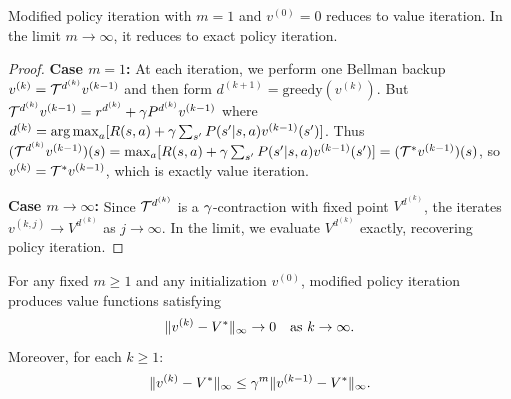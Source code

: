 \documentclass[11pt,a4paper]{article}
\begin{document}
\begin{proposition}
\label{prop:mpi-extremes}
Modified policy iteration with $m = 1$ and $v^{(0)} = 0$ reduces
to value iteration. In the limit $m \to \infty$, it reduces to
exact policy iteration.
\end{proposition}

\begin{proof}
\textbf{Case $m = 1$:} At each iteration, we perform one Bellman
backup $v^{(k)} = \mathcal{T}^{d^{(k)}} v^{(k-1)}$ and then form
$d^{(k+1)} = \text{greedy}(v^{(k)})$. But
$\mathcal{T}^{d^{(k)}} v^{(k-1)} = r^{d^{(k)}} + \gamma P^{d^{(k)}}
v^{(k-1)}$ where $d^{(k)} = \operatorname{arg\,max}_a [R(s,a) + \gamma
\sum_{s'} P(s'|s,a) v^{(k-1)}(s')]$.
Thus $(\mathcal{T}^{d^{(k)}} v^{(k-1)})(s)
= \max_a [R(s,a) + \gamma \sum_{s'} P(s'|s,a) v^{(k-1)}(s')]
= (\mathcal{T}^* v^{(k-1)})(s)$,
so $v^{(k)} = \mathcal{T}^* v^{(k-1)}$, which is exactly value iteration.

\textbf{Case $m \to \infty$:} Since $\mathcal{T}^{d^{(k)}}$ is a
$\gamma$-contraction with fixed point $V^{d^{(k)}}$, the
iterates $v^{(k,j)} \to V^{d^{(k)}}$ as $j \to \infty$. In the
limit, we evaluate $V^{d^{(k)}}$ exactly, recovering policy iteration.
\end{proof}

\begin{theorem}
\label{thm:mpi-convergence}
For any fixed $m \geq 1$ and any initialization $v^{(0)}$, modified
policy iteration produces value functions satisfying
\[
    \|v^{(k)} - V^*\|_\infty \to 0 \quad \text{as } k \to \infty.
\]
Moreover, for each $k \geq 1$:
\begin{equation}
\label{eq:mpi-bound}
    \|v^{(k)} - V^*\|_\infty \leq \gamma^m
    \|v^{(k-1)} - V^*\|_\infty.
\end{equation}
\end{theorem}
\end{document}
